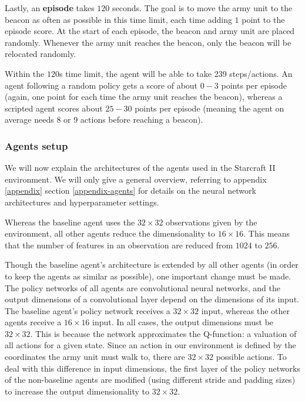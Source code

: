 Lastly, an \textbf{episode} takes $120$ seconds. The goal is to move the army unit to the beacon as often as possible in this time limit, each time adding $1$ point to the episode score. At the start of each episode, the beacon and army unit are placed randomly. Whenever the army unit reaches the beacon, only the beacon will be relocated randomly. 

Within the $120$s time limit, the agent will be able to take 239 steps/actions. An agent following a random policy gets a score of about $0-3$ points per episode (again, one point for each time the army unit reaches the beacon), whereas a scripted agent scores about $25-30$ points per episode (meaning the agent on average needs $8$ or $9$ actions before reaching a beacon).

\subsubsection*{Agents setup}
We will now explain the architectures of the agents used in the Starcraft II environment. We will only give a general overview, referring to appendix \ref{appendix} section \ref{appendix-agents} for details on the neural network architectures and hyperparameter settings. 

Whereas the baseline agent uses the $32 \times 32$ observations given by the environment, all other agents reduce the dimensionality to $16 \times 16$. This means that the number of features in an observation are reduced from $1024$ to $256$.

Though the baseline agent's architecture is extended by all other agents (in order to keep the agents as similar as possible), one important change must be made. The policy networks of all agents are convolutional neural networks, and the output dimensions of a convolutional layer depend on the dimensions of its input. The baseline agent's policy network receives a $32 \times 32$ input, whereas the other agents receive a $16 \times 16$ input. In all cases, the output dimensions must be $32 \times 32$. This is because the network approximates the Q-function: a valuation of all actions for a given state. Since an action in our environment is defined by the coordinates the army unit must walk to, there are $32 \times 32$ possible actions. To deal with this difference in input dimensions, the first layer of the policy networks of the non-baseline agents are modified (using different stride and padding sizes) to increase the output dimensionality to $32 \times 32$.\newline\par

